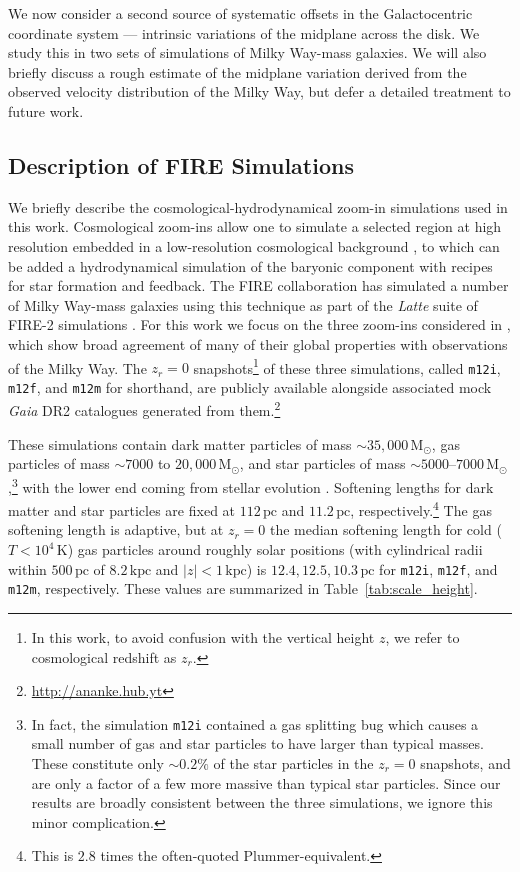 \documentclass[twocolumn]{aastex62}
\newcommand{\Msun}{\ensuremath{\text{M}_\odot}}
\newcommand{\pc}{\text{pc}}
\newcommand{\kpc}{\text{kpc}}
\newcommand{\mi}{\texttt{m12i}}
\newcommand{\mf}{\texttt{m12f}}
\newcommand{\mm}{\texttt{m12m}}
\newcommand{\abs}[1]{\left| #1 \right|}
\newcommand{\z}{z_r}
\begin{document}
We now consider a second source of systematic offsets in the Galactocentric
coordinate system --- intrinsic variations of the midplane across the disk. We
study this in two sets of simulations of Milky Way-mass galaxies. We will also
briefly discuss a rough estimate of the midplane variation derived from the
observed velocity distribution of the Milky Way, but defer a detailed
treatment to future work.

\subsection{Description of FIRE Simulations} \label{ssec:cosmozoom}
We briefly describe the cosmological-hydrodynamical zoom-in simulations used
in this work. Cosmological zoom-ins allow one to simulate a selected region at
high resolution embedded in a low-resolution cosmological background
\citep[e.g.][]{1993ApJ...412..455K,2014MNRAS.437.1894O}, to which can be added
a hydrodynamical simulation of the baryonic component with recipes for star
formation and feedback. The FIRE collaboration has simulated a number of Milky
Way-mass galaxies using this technique as part of the {\em Latte} suite of
FIRE-2 simulations \citep{2016ApJ...827L..23W,2018MNRAS.481.4133G}. For this
work we focus on the three zoom-ins considered in \citet{2018arXiv180610564S},
which show broad agreement of many of their global properties with
observations of the Milky Way. The $\z=0$ snapshots\footnote{In this work, to
avoid confusion with the vertical height $z$, we refer to cosmological
redshift as $\z$.} of these three simulations, called \mi{}, \mf{}, and \mm{}
for shorthand, are publicly available alongside associated mock {\em Gaia} DR2
catalogues generated from them.\footnote{\url{http://ananke.hub.yt}}

These simulations contain dark matter particles of mass $\sim35,000\,\Msun$,
gas particles of mass $\sim 7000$ to $20,000\,\Msun$, and star particles
of mass $\sim 5000 \text{--} 7000\,
\Msun$,\footnote{In fact, the simulation \mi{} contained a gas
splitting bug which causes a small number of gas and star particles to have
larger than typical masses. These constitute only $\sim0.2\%$ of the star
particles in the $\z=0$ snapshots, and are only a factor of a few more massive
than typical star particles. Since our results are broadly consistent between
the three simulations, we ignore this minor complication.} with the lower end
coming from stellar evolution \citep{2018arXiv180610564S}. Softening lengths
for dark matter and star particles are fixed at $112\,\pc$ and $11.2\,\pc$,
respectively.\footnote{This is $2.8$ times the often-quoted
Plummer-equivalent.} The gas softening length is adaptive, but at $\z=0$ the
median softening length for cold ($T < 10^4\,\text{K}$) gas particles around
roughly solar positions (with cylindrical radii within $500\,\pc$ of
$8.2\,\kpc$ and $\abs{z}<1\,\kpc$) is $12.4, 12.5, 10.3\,\pc$ for \mi{},
\mf{}, and \mm{}, respectively. These values are summarized in
Table~\ref{tab:scale_height}.
\end{document}
